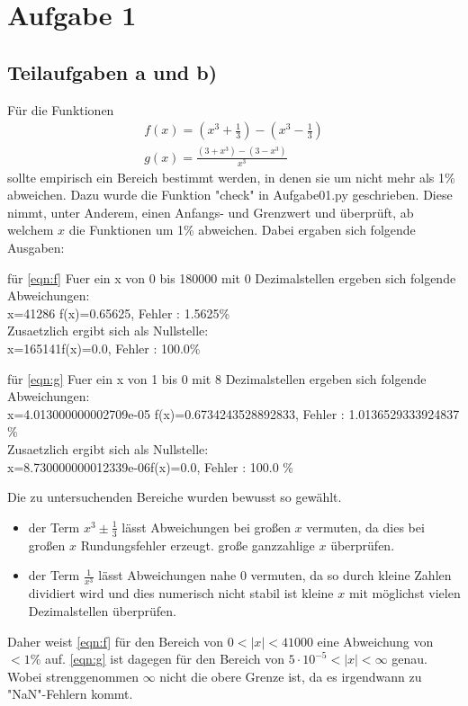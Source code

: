 \section{Aufgabe 1} \label{sec:ab}
\subsection{Teilaufgaben a und b)}
Für die Funktionen
\begin{align}
  f(x)=\left(x^3+\frac{1}{3} \right)-\left(x^3-\frac{1}{3}\right ) \label{eqn:f}\\
  g(x)=\frac{\left(3+x^3 \right)-\left(3-x^3\right )}{x^3} \label{eqn:g}
\end{align}
sollte empirisch ein Bereich bestimmt werden, in denen sie um nicht mehr als 1\% abweichen.
Dazu wurde die Funktion "check" in Aufgabe01.py geschrieben. Diese nimmt, unter Anderem, einen Anfangs- und Grenzwert und überprüft, ab welchem
$x$ die Funktionen um 1\% abweichen.
Dabei ergaben sich folgende Ausgaben:
\begin{console1}{ für \eqref{eqn:f}}
  Fuer ein x von 0 bis 180000 mit 0 Dezimalstellen ergeben sich folgende Abweichungen: \\
  x=41286  f(x)=0.65625, Fehler : 1.5625\% \\

  Zusaetzlich ergibt sich als Nullstelle: \\
  x=165141f(x)=0.0, Fehler : 100.0\% \\
\end{console1}
\begin{console1}{ für \eqref{eqn:g}}
  Fuer ein x von 1 bis 0 mit 8 Dezimalstellen ergeben sich folgende Abweichungen: \\
  x=4.013000000002709e-05  f(x)=0.6734243528892833, Fehler : 1.0136529333924837 \% \\

  Zusaetzlich ergibt sich als Nullstelle: \\
  x=8.730000000012339e-06f(x)=0.0, Fehler : 100.0 \% \\

\end{console1}
Die zu untersuchenden Bereiche wurden bewusst so gewählt.
\begin{itemize}
  \item der Term $x^3 \pm \frac{1}{3}$ lässt Abweichungen bei großen $x$ vermuten, da dies bei großen $x$ Rundungsfehler erzeugt.
  \textrightarrow große ganzzahlige $x$ überprüfen.
  \item der Term  $\frac{1}{x^3}$ lässt Abweichungen nahe $0$ vermuten, da so durch kleine Zahlen dividiert wird  und dies numerisch nicht stabil ist
  \textrightarrow kleine $x$ mit möglichst vielen Dezimalstellen überprüfen.
\end{itemize}
Daher weist \eqref{eqn:f} für den Bereich von $0 < |x| < 41000$ eine Abweichung von $< 1\%$ auf.
\eqref{eqn:g} ist dagegen für den Bereich von $5 \cdot 10^{-5} < |x| < \infty$ genau. \\ Wobei strenggenommen $\infty$ nicht die obere Grenze ist, da es irgendwann zu "NaN"-Fehlern kommt. \\ \\

